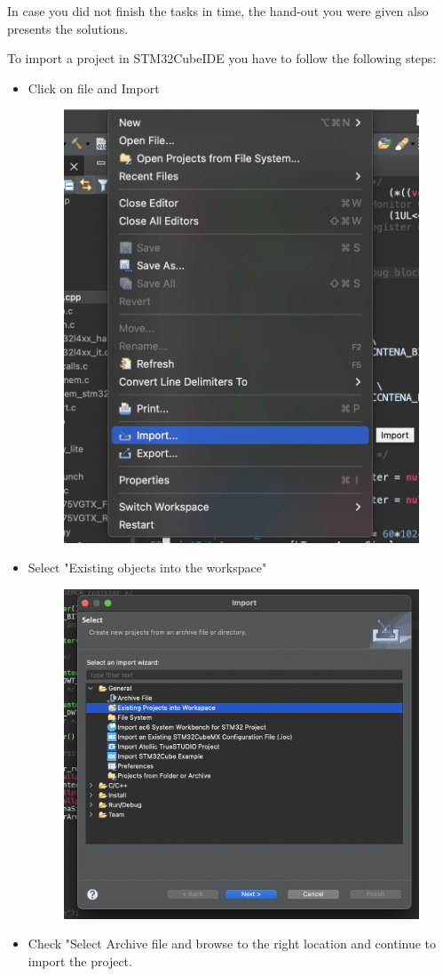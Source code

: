 \documentclass[parskip=half,notes,cadrem,toolver]{iisvlsi}
\begin{document}
In case you did not finish the tasks in time, the hand-out you were given also presents the solutions.

To import a project in STM32CubeIDE you have to follow the following steps:
\begin{itemize}
    \item Click on file and Import
    \begin{figure}[H]
    \begin{center}
        \includegraphics[width=0.5\linewidth]{figures/import1.png}
    \end{center}
\end{figure}

    \item Select "Existing objects into the workspace"

    \begin{figure}[H]
    \begin{center}
        \includegraphics[width=0.5\linewidth]{figures/import2.png}
    \end{center}
\end{figure}


    \item Check "Select Archive file and browse to the right location and continue to import the project.


\end{itemize}
\end{document}
